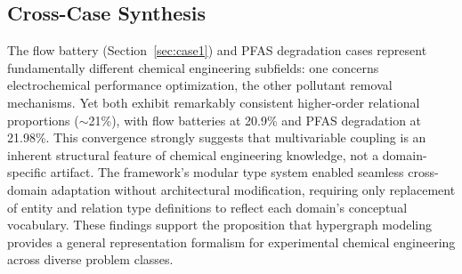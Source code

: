 \subsection{Cross-Case Synthesis}

The flow battery (Section~\ref{sec:case1}) and PFAS degradation cases represent fundamentally different chemical engineering subfields: one concerns electrochemical performance optimization, the other pollutant removal mechanisms. Yet both exhibit remarkably consistent higher-order relational proportions ($\sim$21\%), with flow batteries at 20.9\% and PFAS degradation at 21.98\%. This convergence strongly suggests that multivariable coupling is an inherent structural feature of chemical engineering knowledge, not a domain-specific artifact. The framework's modular type system enabled seamless cross-domain adaptation without architectural modification, requiring only replacement of entity and relation type definitions to reflect each domain's conceptual vocabulary. These findings support the proposition that hypergraph modeling provides a general representation formalism for experimental chemical engineering across diverse problem classes.
